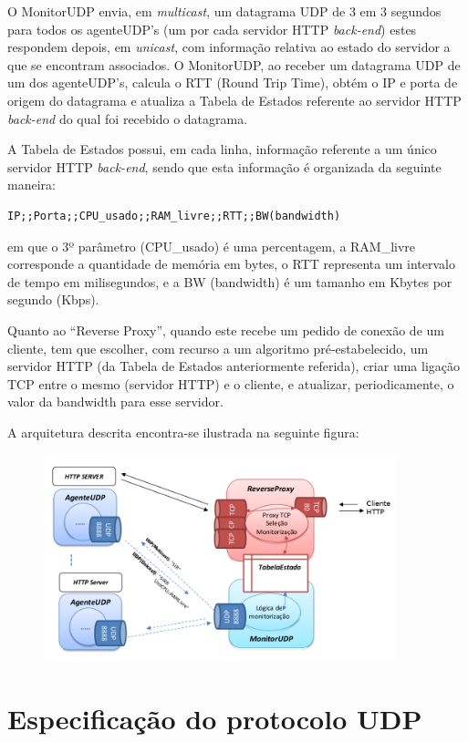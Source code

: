 \documentclass{article}
\begin{document}
O MonitorUDP envia, em \textit{multicast}, um datagrama UDP de 3 em 3 segundos para todos os agenteUDP's (um por cada servidor HTTP \textit{back-end}) estes respondem depois, em \textit{unicast}, com informação relativa ao estado do servidor a que se encontram associados. O MonitorUDP, ao receber um datagrama UDP de um dos agenteUDP's, calcula o RTT (Round Trip Time), obtém o IP e porta de origem do datagrama e atualiza a Tabela de Estados referente ao servidor HTTP \textit{back-end} do qual foi recebido o datagrama.

A Tabela de Estados possui, em cada linha, informação referente a um único servidor HTTP \textit{back-end}, sendo que esta informação é organizada da seguinte maneira:

\begin{verbatim}
IP;;Porta;;CPU_usado;;RAM_livre;;RTT;;BW(bandwidth)
\end{verbatim}
em que o 3º parâmetro (CPU\_usado) é uma percentagem, a RAM\_livre corresponde a quantidade de memória em bytes, o RTT representa um intervalo de tempo em milisegundos, e a BW (bandwidth) é um tamanho em Kbytes por segundo (Kbps).

Quanto ao ``Reverse Proxy'', quando este recebe um pedido de conexão de um cliente, tem que escolher, com recurso a um algoritmo pré-estabelecido,  um servidor HTTP (da Tabela de Estados anteriormente referida), criar uma ligação TCP entre o mesmo (servidor HTTP) e o cliente, e atualizar, periodicamente, o valor da bandwidth para esse servidor.

A arquitetura descrita encontra-se ilustrada na seguinte figura:
\begin{figure}[H]
	\centering
	\includegraphics[height=6cm]{arquitetura.png}
\end{figure}

\section{Especificação do protocolo UDP}
\end{document}
